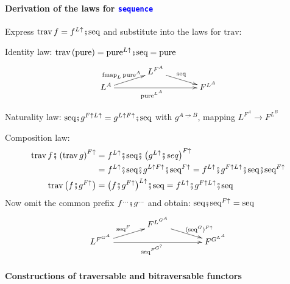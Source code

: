 \paragraph{Derivation of the laws for \texttt{\textcolor{blue}{\footnotesize{}sequence}} }

\vspace{-0.15cm}Express $\text{trav}\,f=f^{L\uparrow}\bef\text{seq}$
and substitute into the laws for $\text{trav}$:

Identity law:{\small{} $\text{trav}\left(\text{pure}\right)=\text{pure}^{L\uparrow}\bef\text{seq}=\text{pure}$}{\footnotesize{}
\[
\xymatrix{\xyScaleY{0.2pc}\xyScaleX{3pc} & L^{F^{A}}\ar[rd]\sp(0.45){\text{seq}}\\
L^{A}\ar[rr]\sb(0.45){\text{pure}^{L^{A}}}\ar[ru]\sp(0.45){\text{fmap}_{L}\,\text{pure}^{A}} &  & F^{L^{A}}
}
\]
}{\footnotesize\par}

Naturality law: $\text{seq}\bef g^{F\uparrow L\uparrow}=g^{L\uparrow F\uparrow}\bef\text{seq}$
with $g^{\underline{A\rightarrow B}}$, mapping $L^{F^{A}}\rightarrow F^{L^{B}}$

Composition law: {\footnotesize{}
\begin{align*}
\text{trav}\,f\bef\left(\text{trav}\,g\right)^{F\uparrow} & =f^{L\uparrow}\bef\text{seq}\bef\left(g^{L\uparrow}\bef seq\right)^{F\uparrow}\\
 & =f^{L\uparrow}\bef\text{seq}\bef g^{L\uparrow F\uparrow}\bef\text{seq}^{F\uparrow}=f^{L\uparrow}\bef g^{F\uparrow L\uparrow}\bef\text{seq}\bef\text{seq}^{F\uparrow}\\
\text{trav}\,\big(f\bef g^{F\uparrow}\big) & =\big(f\bef g^{F\uparrow}\big)^{L\uparrow}\bef\text{seq}=f^{L\uparrow}\bef g^{F\uparrow L\uparrow}\bef\text{seq}
\end{align*}
}Now omit the common prefix $f^{...}\bef g^{...}$ and obtain: $\text{seq}\bef\text{seq}^{F\uparrow}=\text{seq}${\footnotesize{}
\[
\xymatrix{\xyScaleY{0.2pc}\xyScaleX{3pc} & F^{L^{G^{A}}}\ar[rd]\sp(0.6){\ (\text{seq}^{G})^{F\uparrow}}\\
L^{F^{G^{A}}}\ar[ru]\sp(0.45){\text{seq}^{F}}\ar[rr]\sb(0.45){\text{seq}^{F^{G^{?}}}} &  & F^{G^{L^{A}}}
}
\]
}{\footnotesize\par}


\paragraph{Constructions of traversable and bitraversable functors}


